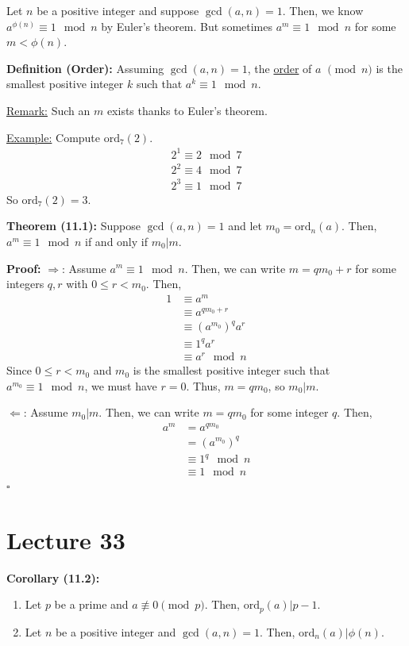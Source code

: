\documentclass{article}
\newcommand*{\qed}{\hfill$\square$}%
\begin{document}
Let $n$ be a positive integer and suppose $\gcd(a,n)=1$. Then, we know $a^{\phi(n)}\equiv 1\mod n$ by Euler's theorem. But sometimes $a^m\equiv 1\mod n$ for some $m<\phi(n)$.

\textbf{Definition (Order):} Assuming $\gcd(a,n)=1$, the \underline{order} of $a$ $\pmod n$ is the smallest positive integer $k$ such that $a^k\equiv 1\mod n$.

\underline{Remark:} Such an $m$ exists thanks to Euler's theorem. 

\newcommand*{\ord}{\text{ord}}

\underline{Example:} Compute $\ord_7(2)$. \begin{align*}
    2^1\equiv 2\mod 7\\
    2^2\equiv 4\mod 7\\
    2^3\equiv 1\mod 7
\end{align*}
So $\ord_7(2)=3$.

\textbf{Theorem (11.1):} Suppose $\gcd(a,n)=1$ and let $m_0=\ord_n(a)$. Then, $a^m\equiv 1\mod n$ if and only if $m_0|m$.

\textbf{Proof:} $\Rightarrow$: Assume $a^m\equiv 1\mod n$. Then, we can write $m=qm_0+r$ for some integers $q,r$ with $0\leq r<m_0$. Then, \begin{align*}
    1&\equiv a^m\\
    &\equiv a^{qm_0+r}\\
    &\equiv (a^{m_0})^qa^r\\
    &\equiv 1^qa^r\\
    &\equiv a^r\mod n
\end{align*}Since $0\leq r<m_0$ and $m_0$ is the smallest positive integer such that $a^{m_0}\equiv 1\mod n$, we must have $r=0$. Thus, $m=qm_0$, so $m_0|m$.

$\Leftarrow$: Assume $m_0|m$. Then, we can write $m=qm_0$ for some integer $q$. Then, \begin{align*}
    a^m&=a^{qm_0}\\
    &=(a^{m_0})^q\\
    &\equiv 1^q\mod n\\
    &\equiv 1\mod n
\end{align*} \qed

\section{Lecture 33}

\textbf{Corollary (11.2):} \begin{enumerate}
    \item Let $p$ be a prime and $a\not\equiv 0\pmod p$. Then, $\ord_p(a)|p-1$.
    \item Let $n$ be a positive integer and $\gcd(a,n)=1$. Then, $\ord_n(a)|\phi(n)$.
\end{enumerate}
\end{document}
